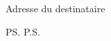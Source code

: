 \documentclass{letter}
\date{\today}
\begin{document}
\begin{letter}{}
    Adresse du destinataire
    
    \ouverture

    \lipsum[1-3]

    \cloture
    \signe

    \ps{P.S. \lipsum[4]}
\end{letter}
\end{document}
